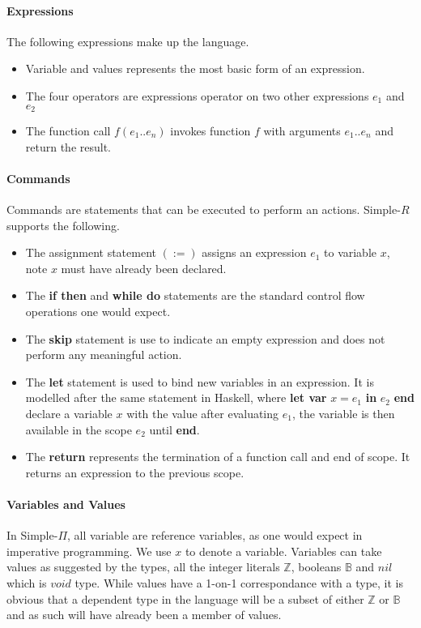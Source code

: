 \documentclass[a4paper,12pt]{report}
\begin{document}
\paragraph{Expressions} The following expressions make up the language.
\begin{itemize}
  \item Variable and values represents the most basic form of an expression.
  \item The four operators are expressions operator on two other expressions $e_1$ 
  and $e_2$
  \item The function call $f(e_1..e_n)$ invokes function $f$ with arguments 
  $e_1..e_n$ and return the result.
\end{itemize}

\paragraph{Commands} Commands are statements that can be executed to perform an 
actions. Simple-$R$ supports the following. 
\begin{itemize}
  \item The assignment statement $(:=)$ assigns an expression $e_1$ to variable 
  $x$, note $x$ must have already been declared. 
  \item The \textbf{if then} and \textbf{while do} statements are the standard 
  control flow operations one would expect.
  \item The \textbf{skip} statement is use to indicate an empty expression and 
  does not perform any meaningful action. 
  \item The \textbf{let} statement is used to bind new variables in an 
  expression. It is modelled after the same statement in Haskell, where \textbf{let var } 
  $x = e_1$ \textbf{in} $e_2$ \textbf{end} declare a variable $x$ with the value after 
  evaluating $e_1$, the variable is then available in the scope $e_2$ until 
  \textbf{end}.
  \item The \textbf{return} represents the termination of a function call and 
  end of scope. It returns an expression to the previous scope. 
\end{itemize}

\paragraph{Variables and Values} In Simple-$\Pi$, all variable are reference 
variables, as one would expect in imperative programming. We use $x$ to denote a 
variable. Variables can take values as suggested by the types, all the integer 
literals $\mathbb{Z}$, booleans $\mathbb{B}$ and $nil$ which is $void$ type. 
While values have a 1-on-1 correspondance with a type, it is obvious that a 
dependent type in the language will be a subset of either 
$\mathbb{Z}$ or $\mathbb{B}$ and as such will have already been a member of 
values.
\end{document}
